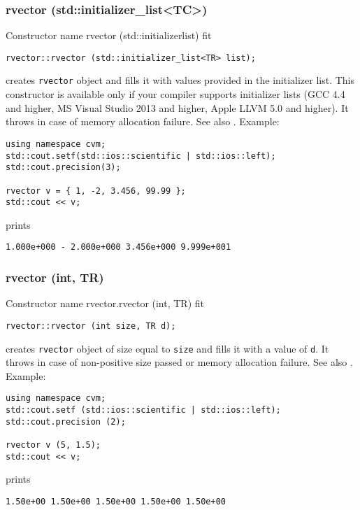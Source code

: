 \subsubsection{rvector (std::initializer\_list<TC>)}
Constructor%
\pdfdest name {rvector (std::initializerlist)} fit
\begin{verbatim}
rvector::rvector (std::initializer_list<TR> list);
\end{verbatim}
creates \verb"rvector" object and fills it with values provided in the initializer list.
This constructor is available only if your compiler supports initializer lists
(GCC 4.4 and higher, MS Visual Studio 2013 and higher, Apple LLVM 5.0 and higher).
It throws  
in case of memory allocation failure.
See also .
Example:
\begin{Verbatim}
using namespace cvm;
std::cout.setf(std::ios::scientific | std::ios::left);
std::cout.precision(3);

rvector v = { 1, -2, 3.456, 99.99 };
std::cout << v;
\end{Verbatim}
prints
\begin{Verbatim}
1.000e+000 - 2.000e+000 3.456e+000 9.999e+001
\end{Verbatim}
\newpage




\subsubsection{rvector (int, TR)}
Constructor%
\pdfdest name {rvector.rvector (int, TR)} fit
\begin{verbatim}
rvector::rvector (int size, TR d);
\end{verbatim}
creates \verb"rvector" object of size equal to \verb"size"
and fills it with a value of \verb"d".
It throws  
in case of non-positive size passed or memory allocation failure.
See also .
Example:
\begin{Verbatim}
using namespace cvm;
std::cout.setf (std::ios::scientific | std::ios::left); 
std::cout.precision (2);

rvector v (5, 1.5);
std::cout << v;
\end{Verbatim}
prints
\begin{Verbatim}
1.50e+00 1.50e+00 1.50e+00 1.50e+00 1.50e+00
\end{Verbatim}
\newpage




